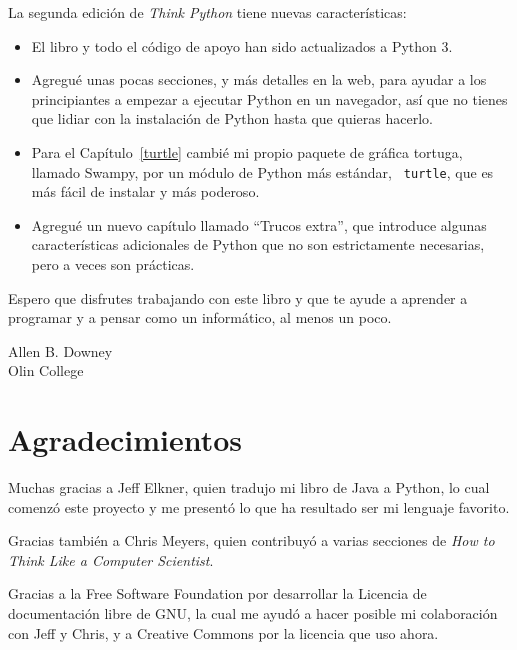 \documentclass[10pt]{book}
\begin{document}
La segunda edición de {\em Think Python} tiene nuevas características:

\begin{itemize}

\item El libro y todo el código de apoyo han sido actualizados a Python 3.

\item Agregué unas pocas secciones, y más detalles en la web, para ayudar a
los principiantes a empezar a ejecutar Python en un navegador, así que no
tienes que lidiar con la instalación de Python hasta que quieras hacerlo.

\item Para el Capítulo~\ref{turtle} cambié mi propio paquete de gráfica
  tortuga, llamado Swampy, por un módulo de Python más estándar, {\tt
    turtle}, que es más fácil de instalar y más poderoso.

\item Agregué un nuevo capítulo llamado ``Trucos extra'', que introduce
algunas características adicionales de Python que no son estrictamente
necesarias, pero a veces son prácticas.

\end{itemize}

Espero que disfrutes trabajando con este libro y que te ayude a aprender
a programar y a pensar como un informático, al menos un poco.


Allen B. Downey \\

Olin College \\


\section*{Agradecimientos}

Muchas gracias a Jeff Elkner, quien
tradujo mi libro de Java a Python, lo cual comenzó este
proyecto y me presentó lo que ha resultado ser mi
lenguaje favorito.

Gracias también a Chris Meyers, quien contribuyó a varias secciones
de {\em How to Think Like a Computer Scientist}.

Gracias a la Free Software Foundation por desarrollar
la Licencia de documentación libre de GNU, la cual me ayudó
a hacer posible mi colaboración con Jeff y Chris, y a Creative
Commons por la licencia que uso ahora.
\end{document}
